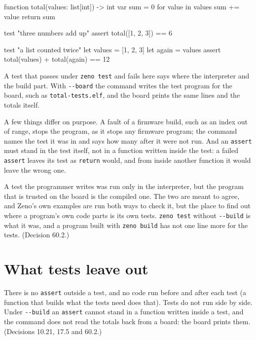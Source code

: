 \begin{zeno}[file=total.zeno, dir=build, show=no, fails=yes, cmd=zeno test --build --firmware --no-collector {file}]
function total(values: list[int]) -> int {
    var sum = 0
    for value in values {
        sum += value
    }
    return sum
}

test "three numbers add up" {
    assert total([1, 2, 3]) == 6
}

test "a list counted twice" {
    let values = [1, 2, 3]
    let again = values
    assert total(values) + total(again) == 12
}
\end{zeno}

A test that passes under \verb|zeno test| and fails here says where
the interpreter and the build part. With \verb|--board| the command
writes the test program for the board, such as \verb|total-tests.elf|,
and the board prints the same lines and the totals itself.

A few things differ on purpose. A fault of a firmware build, such as
an index out of range, stops the program, as it stops any firmware
program; the command names the test it was in and says how many after
it were not run. And an \verb|assert| must stand in the test itself,
not in a function written inside the test: a failed \verb|assert|
leaves its test as \verb|return| would, and from inside another
function it would leave the wrong one.

\begin{why}
A test the programmer writes was run only in the interpreter, but the
program that is trusted on the board is the compiled one. The two are
meant to agree, and Zeno's own examples are run both ways to check it,
but the place to find out where a program's own code parts is its own
tests. \verb|zeno test| without \verb|--build| is what it was, and a
program built with \verb|zeno build| has not one line more for the
tests. (Decision 60.2.)
\end{why}

\section{What tests leave out}

There is no \verb|assert| outside a test, and no code run before and
after each test (a function that builds what the tests need does
that). Tests do not run side by side. Under \verb|--build| an
\verb|assert| cannot stand in a function written inside a test, and
the command does not read the totals back from a board: the board
prints them. (Decisions 10.21, 17.5 and 60.2.)

